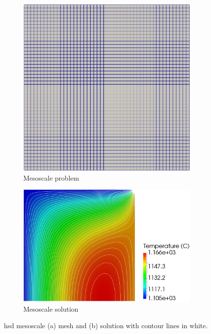 \begin{figure}[!h]
\centering
\begin{subfigure}{.45\textwidth}
  \centering
  \includegraphics[height=0.72\linewidth]{figs/mesoscale_9_mesh.png}
  \caption{Mesoscale problem}
  \label{fig:nine_particle_mesoscalea}
\end{subfigure}
\begin{subfigure}{.45\textwidth}
  \centering
  \includegraphics[height=0.71\linewidth]{figs/compact_9_mesoscale.png}
  \caption{Mesoscale solution}
  \label{fig:nine_particle_mesoscaleb}
\end{subfigure}
\caption{\gls{hsd} mesoscale (a) mesh and (b) solution with contour lines in white.}
\label{fig:nine_particle_mesoscale}
\end{figure}

